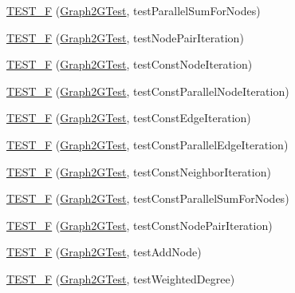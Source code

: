 \begin{DoxyCompactItemize}
\item 
\hyperlink{namespace_ensemble_clustering_a472d662bb42141e4d1a00597efc55cb8}{T\-E\-S\-T\-\_\-\-F} (\hyperlink{class_ensemble_clustering_1_1_graph2_g_test}{Graph2\-G\-Test}, test\-Parallel\-Sum\-For\-Nodes)
\item 
\hyperlink{namespace_ensemble_clustering_ac1464288fccb3e5b6877c5e0713df44e}{T\-E\-S\-T\-\_\-\-F} (\hyperlink{class_ensemble_clustering_1_1_graph2_g_test}{Graph2\-G\-Test}, test\-Node\-Pair\-Iteration)
\item 
\hyperlink{namespace_ensemble_clustering_a7f6c36a00352725422906914fb23b4f4}{T\-E\-S\-T\-\_\-\-F} (\hyperlink{class_ensemble_clustering_1_1_graph2_g_test}{Graph2\-G\-Test}, test\-Const\-Node\-Iteration)
\item 
\hyperlink{namespace_ensemble_clustering_ae769275d2a0aa811a9ba23a080692166}{T\-E\-S\-T\-\_\-\-F} (\hyperlink{class_ensemble_clustering_1_1_graph2_g_test}{Graph2\-G\-Test}, test\-Const\-Parallel\-Node\-Iteration)
\item 
\hyperlink{namespace_ensemble_clustering_af12665e699e4940200e52412469720b0}{T\-E\-S\-T\-\_\-\-F} (\hyperlink{class_ensemble_clustering_1_1_graph2_g_test}{Graph2\-G\-Test}, test\-Const\-Edge\-Iteration)
\item 
\hyperlink{namespace_ensemble_clustering_a08e3b47f5744bf89e24c953909dc16fd}{T\-E\-S\-T\-\_\-\-F} (\hyperlink{class_ensemble_clustering_1_1_graph2_g_test}{Graph2\-G\-Test}, test\-Const\-Parallel\-Edge\-Iteration)
\item 
\hyperlink{namespace_ensemble_clustering_ac7a29e9c993d528b0ee460ee28ffe6b1}{T\-E\-S\-T\-\_\-\-F} (\hyperlink{class_ensemble_clustering_1_1_graph2_g_test}{Graph2\-G\-Test}, test\-Const\-Neighbor\-Iteration)
\item 
\hyperlink{namespace_ensemble_clustering_aaca40f4c5bc09e7e764a228b680bd938}{T\-E\-S\-T\-\_\-\-F} (\hyperlink{class_ensemble_clustering_1_1_graph2_g_test}{Graph2\-G\-Test}, test\-Const\-Parallel\-Sum\-For\-Nodes)
\item 
\hyperlink{namespace_ensemble_clustering_ad043e4b6149f93836af27d0fad532ce2}{T\-E\-S\-T\-\_\-\-F} (\hyperlink{class_ensemble_clustering_1_1_graph2_g_test}{Graph2\-G\-Test}, test\-Const\-Node\-Pair\-Iteration)
\item 
\hyperlink{namespace_ensemble_clustering_a0c75c50c72e66c27ea285b85b65d5fee}{T\-E\-S\-T\-\_\-\-F} (\hyperlink{class_ensemble_clustering_1_1_graph2_g_test}{Graph2\-G\-Test}, test\-Add\-Node)
\item 
\hyperlink{namespace_ensemble_clustering_a28b85a4a583a559d95c3a78796e73fd8}{T\-E\-S\-T\-\_\-\-F} (\hyperlink{class_ensemble_clustering_1_1_graph2_g_test}{Graph2\-G\-Test}, test\-Weighted\-Degree)

\end{DoxyCompactItemize}
